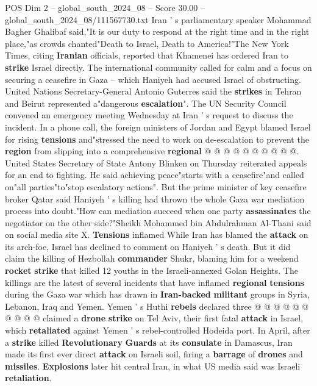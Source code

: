 \begin{textsample}{POS Dim 2 – global\_south\_2024\_08 – Score 30.00 – global\_south\_2024\_08/111567730.txt}
Iran ' s parliamentary speaker Mohammad Bagher Ghalibaf said,"It is our duty to respond at the right time and in the right place,"as crowds chanted"Death to Israel, Death to America!"The New York Times, citing \textbf{Iranian} officials, reported that Khamenei has ordered Iran to \textbf{strike} Israel directly.
The international community called for calm and a focus on securing a ceasefire in Gaza -- which Haniyeh had accused Israel of obstructing.
United Nations Secretary-General Antonio Guterres said the \textbf{strikes} in Tehran and Beirut represented a"dangerous \textbf{escalation}".
The UN Security Council convened an emergency meeting Wednesday at Iran ' s request to discuss the incident.
In a phone call, the foreign ministers of Jordan and Egypt blamed Israel for rising \textbf{tensions} and"stressed the need to work on de-escalation to prevent the \textbf{region} from slipping into a comprehensive \textbf{regional} @ @ @ @ @ @ @ @ @ @.
United States Secretary of State Antony Blinken on Thursday reiterated appeals for an end to fighting.
He said achieving peace"starts with a ceasefire"and called on"all parties"to"stop escalatory actions".
But the prime minister of key ceasefire broker Qatar said Haniyeh ' s killing had thrown the whole Gaza war mediation process into doubt."How can mediation succeed when one party \textbf{assassinates} the negotiator on the other side?"Sheikh Mohammed bin Abdulrahman Al-Thani said on social media site X. \textbf{Tensions} inflamed While Iran has blamed the \textbf{attack} on its arch-foe, Israel has declined to comment on Haniyeh ' s death.
But it did claim the killing of Hezbollah \textbf{commander} Shukr, blaming him for a weekend \textbf{rocket} \textbf{strike} that killed 12 youths in the Israeli-annexed Golan Heights.
The killings are the latest of several incidents that have inflamed \textbf{regional} \textbf{tensions} during the Gaza war which has drawn in \textbf{Iran-backed} \textbf{militant} groups in Syria, Lebanon, Iraq and Yemen.
Yemen ' s Huthi \textbf{rebels} declared three @ @ @ @ @ @ @ @ @ @ claimed a \textbf{drone} \textbf{strike} on Tel Aviv, their first fatal \textbf{attack} in Israel, which \textbf{retaliated} against Yemen ' s rebel-controlled Hodeida port.
In April, after a \textbf{strike} killed \textbf{Revolutionary} \textbf{Guards} at its \textbf{consulate} in Damascus, Iran made its first ever direct \textbf{attack} on Israeli soil, firing a \textbf{barrage} of \textbf{drones} and \textbf{missiles}. \textbf{Explosions} later hit central Iran, in what US media said was Israeli \textbf{retaliation}.

\end{textsample}
